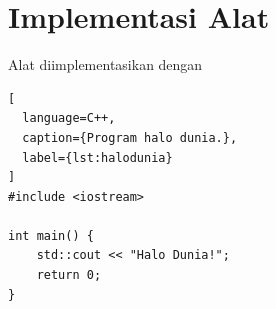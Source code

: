 \section{Implementasi Alat
\label{sec:implementasi alat}}

Alat diimplementasikan dengan \lipsum[1]

\begin{lstlisting}[
  language=C++,
  caption={Program halo dunia.},
  label={lst:halodunia}
]
#include <iostream>

int main() {
    std::cout << "Halo Dunia!";
    return 0;
}
\end{lstlisting}

\lipsum[2-3]



\lipsum[4]
